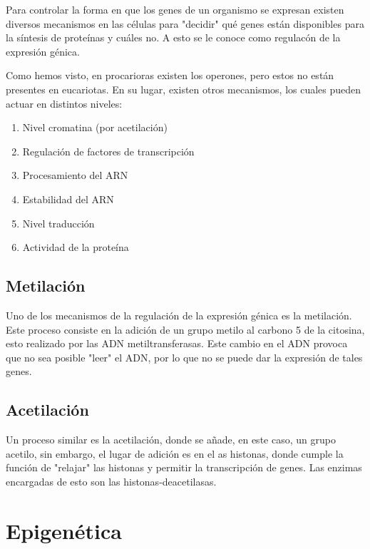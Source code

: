 Para controlar la forma en que los genes de un organismo se expresan existen diversos mecanismos en las células para "decidir" qué genes están disponibles para la síntesis de proteínas y cuáles no. A esto se le conoce como regulacón de la expresión génica.

Como hemos visto, en procarioras existen los operones, pero estos no están presentes en eucariotas. En su lugar, existen otros mecanismos, los cuales pueden actuar en distintos niveles:

\begin{enumerate}
    \item Nivel cromatina (por acetilación)
    \item Regulación de factores de transcripción
    \item Procesamiento del ARN
    \item Estabilidad del ARN
    \item Nivel traducción
    \item Actividad de la proteína
\end{enumerate}

\subsection{Metilación}

Uno de los mecanismos de la regulación de la expresión génica es la metilación. Este proceso consiste en la adición de un grupo metilo al carbono 5 de la citosina, esto realizado por las ADN metiltransferasas. Este cambio en el ADN  provoca  que no sea posible "leer" el ADN, por lo que no se puede dar la expresión de tales genes.

\subsection{Acetilación}

Un proceso similar es la acetilación, donde se añade, en este caso, un grupo acetilo, sin embargo, el lugar de adición es en el as histonas, donde cumple la función de "relajar" las histonas y permitir la transcripción de genes. Las enzimas encargadas de esto son las histonas-deacetilasas.

\section{Epigenética}


